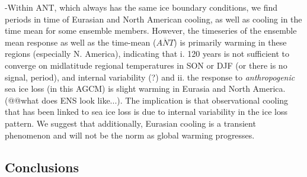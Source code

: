 \documentclass[twocol]{ametsoc}
\begin{document}
-Within ANT, which always has the same ice boundary conditions, we find periods in time of Eurasian and North American cooling, as well as cooling in the time mean for some ensemble members. However, the timeseries of the ensemble mean response as well as the time-mean ($\overline{ANT}$) is primarily warming in these regions (especially N. America), indicating that i. 120 years is not sufficient to converge on midlatitude regional temperatures in SON or DJF (or there is no signal, period), and internal variability (?)   and ii. the response to \textit{anthropogenic} sea ice loss (in this AGCM) is slight warming in Eurasia and North America. (@@what does ENS look like...). The implication is that observational cooling that has been linked to sea ice loss is due to internal variability in the ice loss pattern. We suggest that additionally, Eurasian cooling is a transient phenomenon and will not be the norm as global warming progresses.

\subsection{Conclusions}
\end{document}
